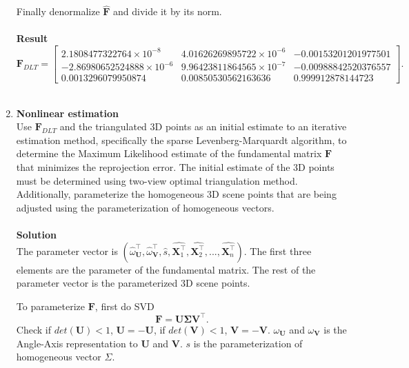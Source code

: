 \documentclass{../../assignment}
\begin{document}
\begin{problemlist}
\begin{enumerate}
Finally denormalize $\hat{\mathbf{F}}$ and divide it by its norm.
\\\\
\textbf{Result}\\
\[
\mathbf{F}_{DLT} = 
\begin{bmatrix}
2.1808477322764\times 10^{-8} & 4.01626269895722\times 10^{-6} & -0.00153201201977501\\
-2.86980652524888\times 10^{-6} & 9.96423811864565\times 10^{-7} & -0.00988842520376557\\
0.0013296079950874 & 0.00850530562163636 & 0.999912878144723
\end{bmatrix}.
\]
\\
\item \textbf{Nonlinear estimation}\\
Use $\mathbf{F}_{DLT}$ and the triangulated 3D points as an initial estimate to an iterative estimation method, specifically the sparse Levenberg-Marquardt algorithm, to determine the Maximum Likelihood estimate of the fundamental matrix $\mathbf{F}$ that minimizes the reprojection error. The initial estimate of the 3D points must be determined using two-view optimal triangulation method. Additionally, parameterize the homogeneous 3D scene points that are being adjusted using the parameterization of homogeneous vectors. 
\\\\
\textbf{Solution}\\
The parameter vector is $(\hat{\omega}_{\mathbf{U}}^{\top},\hat{\omega}_{\mathbf{V}}^{\top},\hat{s},\hat{\mathbf{X}_1^{\top}},\hat{\mathbf{X}_2^{\top}},...,\hat{\mathbf{X}_n^{\top}})$. The first three elements are the parameter of the fundamental matrix. The rest of the parameter vector is the parameterized 3D scene points.

To parameterize $\mathbf{F}$, first do SVD
$$\mathbf{F} = \mathbf{U\Sigma V}^{\top}.$$
Check if $det(\mathbf{U})<1$, $\mathbf{U} = -\mathbf{U}$, if $det(\mathbf{V})<1$, $\mathbf{V} = -\mathbf{V}$. $\omega_{\mathbf{U}}$ and $\omega_{\mathbf{V}}$ is the Angle-Axis representation to $\mathbf{U}$ and $\mathbf{V}$. $s$ is the parameterization of homogeneous vector $\Sigma$.


\end{enumerate}
\end{problemlist}
\end{document}
